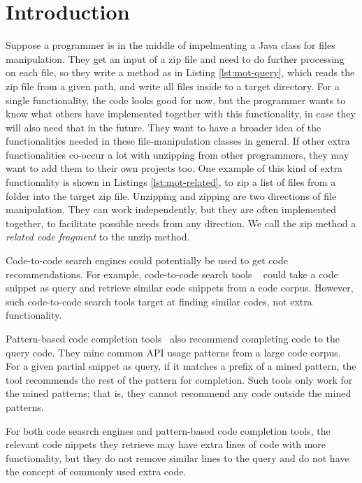 \section{Introduction}
\label{sec:intro}



Suppose a programmer is in the middle of impelmenting a Java class for files manipulation. They get an input of a zip file and need to do further processing on each file, so they write a method as in Listing \ref{lst:mot-query}, which reads the zip file from a given path, and write all files inside to a target directory. For a single functionality, the code looks good for now, but the programmer wants to know what others have implemented together with this functionality, in case they will also need that in the future. They want to have a broader idea of the functionalities needed in these file-manipulation classes in general. If other extra functionalities co-occur a lot with unzipping from other programmers, they may want to add them to their own projects too. One example of this kind of extra functionality is shown in Listings \ref{lst:mot-related}, to zip a list of files from a folder into the target zip file. Unzipping and zipping are two directions of file manipulation. They can work independently, but they are often implemented together, to facilitate possible needs from any direction. We call the zip method a \textit{related code fragment} to the unzip method.


Code-to-code search engines could potentially be used to get code recommendations. For example, code-to-code search tools ~\cite{kim2018Facoy, krugle, searchcode} could take a code snippet as query and retrieve similar code snippets from a code corpus. However, such code-to-code search tools target at finding similar codes, not extra functionality. 

Pattern-based code completion tools~\cite{nguyen2009groum, nguyen2012grapacc} also recommend completing code to the query code. They mine common API usage patterns from a large code corpus. For a given partial snippet as query, if it matches a prefix of a mined pattern, the tool recommends the rest of the pattern for completion. Such tools only work for the mined patterns; that is, they cannot recommend any code outside the mined patterns.

For both code seasrch engines and pattern-based code completion tools, the relevant code nippets they retrieve may have extra lines of code with more functionality, but they do not remove similar lines to the query and do not have the concept of commonly used extra code.

